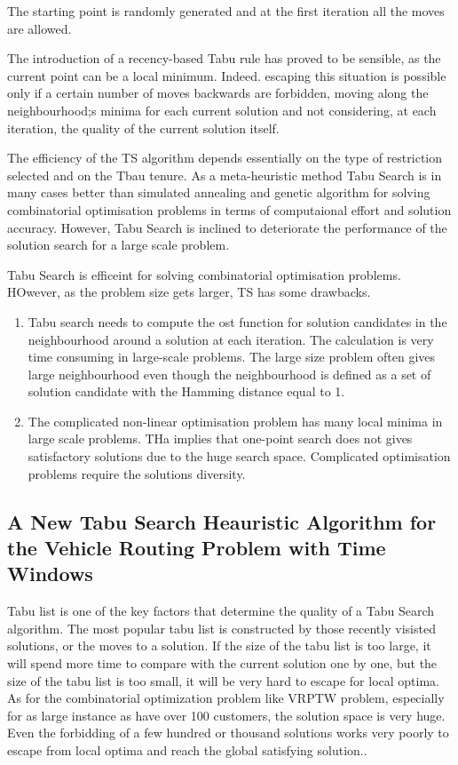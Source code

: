 The starting point is randomly generated and at the first iteration all the moves are allowed.

The introduction of a recency-based Tabu rule has proved to be sensible, as the current point can be a local minimum. Indeed. escaping this situation is possible only if a certain number of moves backwards are forbidden, moving along the neighbourhood;s minima for each current solution and not considering, at each iteration, the quality of the current solution itself.

The efficiency of the TS algorithm depends essentially on the type of restriction selected and on the Tbau tenure. As a meta-heuristic method Tabu Search is in many cases better than simulated annealing and genetic algorithm for solving combinatorial optimisation problems in terms of computaional effort and solution accuracy. However, Tabu Search is inclined to deteriorate the performance of the solution search for a large scale problem.

Tabu Search is efficeint for solving combinatorial optimisation problems. HOwever, as the problem size gets larger, TS has some drawbacks.

\begin{enumerate}
\item Tabu search needs to compute the ost function for solution candidates in the neighbourhood around a solution at each iteration. The calculation is very time consuming in large-scale problems. The large size problem often gives large neighbourhood even though the neighbourhood is defined as a set of solution candidate with the Hamming distance equal to 1.
\item The complicated non-linear optimisation problem has many local minima in large scale problems. THa implies that one-point search does not gives satisfactory solutions due to the huge search space. Complicated optimisation problems require the solutions diversity.
\end{enumerate}

\subsection{A New Tabu Search Heauristic Algorithm for the Vehicle Routing Problem with Time Windows}
Tabu list is one of the key factors that determine the quality of a Tabu Search algorithm. The most popular tabu list is constructed by those recently visisted solutions, or the moves to a solution. If the size of the tabu list is too large, it will spend more time to compare with the current solution one by one, but the size of the tabu list is too small, it will be very hard to escape for local optima. As for the combinatorial optimization problem like VRPTW problem, especially for as large instance as have over 100 customers, the solution space is very huge. Even the forbidding of a few hundred or thousand solutions works very poorly to escape from local optima and reach the global satisfying solution..

